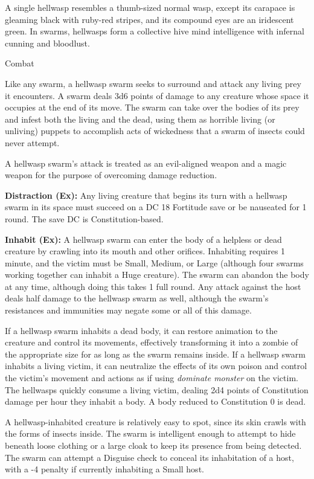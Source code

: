 \documentclass{article}
\begin{document}
A single hellwasp resembles a thumb-sized normal wasp, except its carapace is gleaming 
black with ruby-red stripes, and its compound eyes are an iridescent green. In 
swarms, hellwasps form a collective hive mind intelligence with infernal cunning 
and bloodlust.

Combat

Like any swarm, a hellwasp swarm seeks to surround and attack any living prey it 
encounters. A swarm deals 3d6 points of damage to any creature whose space it occupies 
at the end of its move. The swarm can take over the bodies of its prey and infest 
both the living and the dead, using them as horrible living (or unliving) puppets 
to accomplish acts of wickedness that a swarm of insects could never attempt.

A hellwasp swarm's attack is treated as an evil-aligned weapon and a magic weapon 
for the purpose of overcoming damage reduction.

\textbf{Distraction (Ex): }Any living creature that begins its turn with a hellwasp 
swarm in its space must succeed on a DC 18 Fortitude save or be nauseated for 1 
round. The save DC is Constitution-based.

\textbf{Inhabit (Ex): }A hellwasp swarm can enter the body of a helpless or dead 
creature by crawling into its mouth and other orifices. Inhabiting requires 1 minute, 
and the victim must be Small, Medium, or Large (although four swarms working together 
can  inhabit a Huge creature). The swarm can abandon the body at any time, although 
doing this takes 1 full round. Any attack against the host deals half damage to 
the hellwasp swarm as well, although the swarm's resistances and immunities may 
negate some or all of this damage.

If a hellwasp swarm inhabits a dead body, it can restore animation to the creature 
and control its movements, effectively transforming it into a zombie of the appropriate 
size for as long as the swarm remains inside. If a hellwasp swarm inhabits a living 
victim, it can neutralize the effects of its own poison and control the victim's 
movement and actions as if using \textit{dominate monster }on the victim. The hellwasps 
quickly consume a living victim, dealing 2d4 points of Constitution damage per 
hour they inhabit a body. A body reduced to Constitution 0 is dead.

A hellwasp-inhabited creature is relatively easy to spot, since its skin crawls 
with the forms of insects inside. The swarm is intelligent enough to attempt to 
hide beneath loose clothing or a large cloak to keep its presence from being detected. 
The swarm can attempt a Disguise check to conceal its inhabitation of a host, with 
a -4 penalty if currently inhabiting a Small host.  
\end{document}
